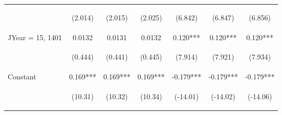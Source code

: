 \documentclass[]{standalone}
\begin{document}
\begin{tabular}{lcccccc}
    \vspace{4pt}     & \begin{footnotesize}(2.014)\end{footnotesize}  & \begin{footnotesize}(2.015)\end{footnotesize}  & \begin{footnotesize}(2.025)\end{footnotesize}  & \begin{footnotesize}(6.842)\end{footnotesize}  & \begin{footnotesize}(6.847)\end{footnotesize}  & \begin{footnotesize}(6.856)\end{footnotesize}  \\
    JYear = 15, 1401 & 0.0132                                         & 0.0131                                         & 0.0132                                         & 0.120***                                       & 0.120***                                       & 0.120***                                       \\
    \vspace{4pt}     & \begin{footnotesize}(0.444)\end{footnotesize}  & \begin{footnotesize}(0.441)\end{footnotesize}  & \begin{footnotesize}(0.445)\end{footnotesize}  & \begin{footnotesize}(7.914)\end{footnotesize}  & \begin{footnotesize}(7.921)\end{footnotesize}  & \begin{footnotesize}(7.934)\end{footnotesize}  \\
    Constant         & 0.169***                                       & 0.169***                                       & 0.169***                                       & -0.179***                                      & -0.179***                                      & -0.179***                                      \\
                     & \begin{footnotesize}(10.31)\end{footnotesize}  & \begin{footnotesize}(10.32)\end{footnotesize}  & \begin{footnotesize}(10.34)\end{footnotesize}  & \begin{footnotesize}(-14.01)\end{footnotesize} & \begin{footnotesize}(-14.02)\end{footnotesize} & \begin{footnotesize}(-14.06)\end{footnotesize} \\

\end{tabular}
\end{document}
